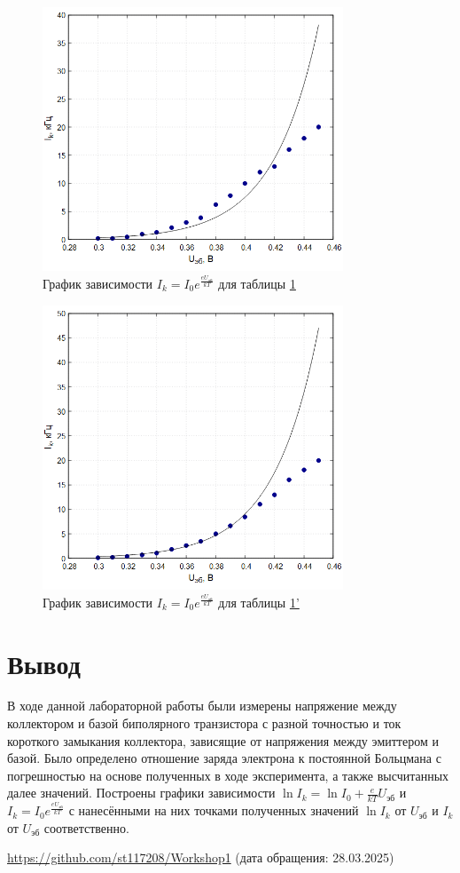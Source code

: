 \begin{figure}
\centering
\includegraphics[width=0.8\textwidth]{Plot3.png}
\caption{График зависимости $I_k = I_0e^{\frac{eU_{\text{эб}}}{kT}}$ для таблицы \hyperref[tabl:2]{1}}
\label{fig:plot3}
\end{figure}

\begin{figure}
\centering
\includegraphics[width=0.8\textwidth]{Plot4.png}
\caption{График зависимости $I_k = I_0e^{\frac{eU_{\text{эб}}}{kT}}$ для таблицы \hyperref[tabl:2]{1'}}
\label{fig:plot4}
\end{figure}

\section{Вывод}
В ходе данной лабораторной работы были измерены напряжение между коллектором и базой биполярного транзистора с разной точностью и ток короткого замыкания коллектора, зависящие от напряжения между эмиттером и базой. Было определено отношение заряда электрона к постоянной Больцмана с погрешностью на основе полученных в ходе эксперимента, а также высчитанных далее значений. Построены графики зависимости $\ln I_k = \ln I_0 + \frac{e}{kT}U_{\text{эб}}$ и $I_k = I_0e^{\frac{eU_{\text{эб}}}{kT}}$ с нанесёнными на них точками полученных значений $\ln I_k$ от $U_{\text{эб}}$ и $I_k$ от $U_{\text{эб}}$ соответственно.

\begin{thebibliography}{9}
\url{https://github.com/st117208/Workshop1}  (дата обращения: 28.03.2025)
\end{thebibliography}